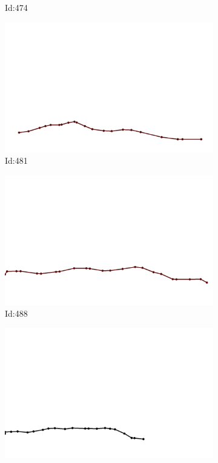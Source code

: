 \documentclass[12pt,twoside]{report}
\begin{document}
\begin{figure}
\begin{subfigure}[b]{0.20\textwidth}
\caption{Id:474}
\end{subfigure}
\begin{subfigure}[b]{0.20\textwidth}
\centering
\includegraphics[width=\textwidth]{../trajectories/481.png}
\caption{Id:481}
\end{subfigure}
\begin{subfigure}[b]{0.20\textwidth}
\centering
\includegraphics[width=\textwidth]{../trajectories/488.png}
\caption{Id:488}
\end{subfigure}
\begin{subfigure}[b]{0.20\textwidth}
\centering
\includegraphics[width=\textwidth]{../trajectories/490.png}

\end{subfigure}
\end{figure}
\end{document}
